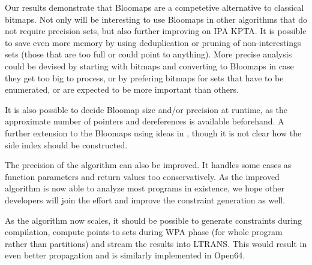 Our results demonstrate that Bloomaps are a competetive alternative
to classical bitmaps. Not only will be interesting to use Bloomaps in other
algorithms that do not require precision sets, but also further improving on IPA
KPTA. It is possible to save even more memory by using deduplication or pruning
of non-interestings sets (those that are too full or could point to anything).
More precise analysis could be devised by starting with bitmaps and converting
to Bloomaps in case they get too big to process, or by prefering bitmaps for
sets that have to be enumerated, or are expected to be more important than others.

It is also possible to decide Bloomap size and/or precision at runtime, as the
approximate number of pointers and dereferences is available beforehand. A
further extension to the Bloomaps using ideas in \cite{Guo06thedynamic}, though it
is not clear how the side index should be constructed.

The precision of the algorithm can also be improved. It handles some cases
as function parameters and return values too conservatively. As the improved
algorithm is now able to analyze most programs in existence, we hope other
developers will join the effort and improve the constraint generation as well.

As the algorithm now scales, it should be possible to generate constraints
during compilation, compute points-to sets during WPA phase (for whole program
rather than partitions) and stream the results into LTRANS. This would result
in even better propagation and is similarly implemented in Open64.
